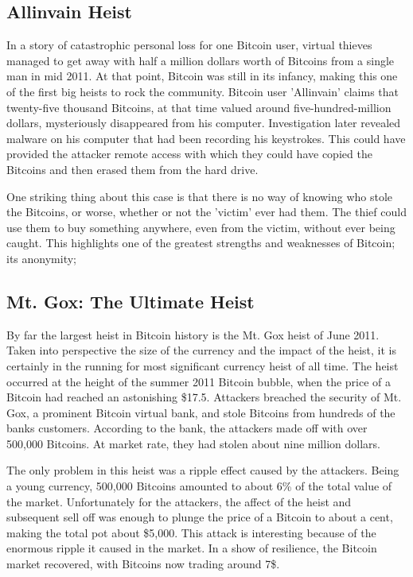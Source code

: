 \documentclass{report}
\begin{document}
\subsection*{Allinvain Heist}
In a story of catastrophic personal loss for one Bitcoin user, virtual thieves managed 
to get away with half a million dollars worth of Bitcoins from a single man in mid 2011\cite{Worstall:Allinvain}.
At that point, Bitcoin was still in its infancy, making this one of the first big heists 
to rock the community.  Bitcoin user 'Allinvain' claims that twenty-five thousand Bitcoins,
at that time valued around five-hundred-million dollars, mysteriously disappeared from 
his computer.  Investigation later revealed malware on his computer that had been recording
his keystrokes.  This could have provided the attacker remote access with which they could
have copied the Bitcoins and then erased them from the hard drive.

One striking thing about this case is that there is no way of knowing who stole the Bitcoins, 
or worse, whether or not the 'victim' ever had them.  The thief could use them to buy 
something anywhere, even from the victim, without ever being caught.  This highlights one 
of the greatest strengths and weaknesses of Bitcoin; its anonymity;

\subsection*{Mt. Gox: The Ultimate Heist}
By far the largest heist in Bitcoin history is the Mt. Gox heist of June 2011\cite{Rashid:MtGox}.  Taken into
perspective the size of the currency and the impact of the heist, it is certainly in the
running for most significant currency heist of all time.  The heist occurred at the height
of the summer 2011 Bitcoin bubble, when the price of a Bitcoin had reached an astonishing
\$17.5.  Attackers breached the security of Mt. Gox, a prominent Bitcoin virtual bank,
and stole Bitcoins from hundreds of the banks customers.  According to the bank, the attackers
made off with over 500,000 Bitcoins.  At market rate, they had stolen about nine million
dollars.

The only problem in this heist was a ripple effect caused by the attackers.  Being a young
currency, 500,000 Bitcoins amounted to about 6\% of the total value of the market.
Unfortunately for the attackers, the affect of the heist and subsequent sell off was enough
to plunge the price of a Bitcoin to about a cent, making the total pot about \$5,000.  This
attack is interesting because of the enormous ripple it caused in the market.  In a show of
resilience, the Bitcoin market recovered, with Bitcoins now trading around 7\$.
\end{document}

